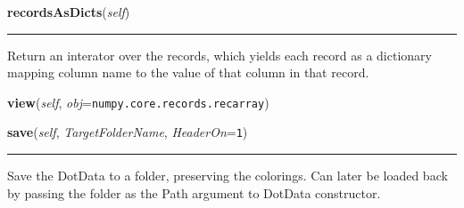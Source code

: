     \label{Classes:DotData:DotData:recordsAsDicts}

    \vspace{0.5ex}

\hspace{.8\funcindent}\begin{boxedminipage}{\funcwidth}

    \raggedright \textbf{recordsAsDicts}(\textit{self})

    \vspace{-1.5ex}

    \rule{\textwidth}{0.5\fboxrule}
\setlength{\parskip}{2ex}
    Return an interator over the records, which yields each record as a 
    dictionary mapping column name to the value of that column in that 
    record.

\setlength{\parskip}{1ex}
    \end{boxedminipage}

    \label{Classes:DotData:DotData:view}

    \vspace{0.5ex}

\hspace{.8\funcindent}\begin{boxedminipage}{\funcwidth}

    \raggedright \textbf{view}(\textit{self}, \textit{obj}={\tt numpy.core.records.recarray})

\setlength{\parskip}{2ex}
\setlength{\parskip}{1ex}
    \end{boxedminipage}

    \label{Classes:DotData:DotData:save}

    \vspace{0.5ex}

\hspace{.8\funcindent}\begin{boxedminipage}{\funcwidth}

    \raggedright \textbf{save}(\textit{self}, \textit{TargetFolderName}, \textit{HeaderOn}={\tt 1})

    \vspace{-1.5ex}

    \rule{\textwidth}{0.5\fboxrule}
\setlength{\parskip}{2ex}
    Save the DotData to a folder, preserving the colorings.  Can later be 
    loaded back by passing the folder as the Path argument to DotData 
    constructor.

\setlength{\parskip}{1ex}
    \end{boxedminipage}

